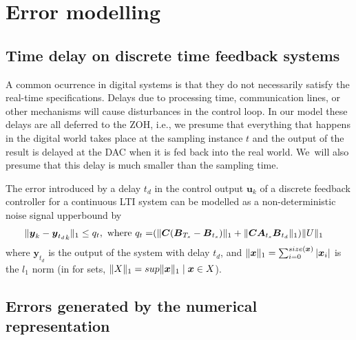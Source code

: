 \documentclass[sigconf]{llncs}
\DeclarePairedDelimiter\norm{\lVert}{\rVert}
\newcommand{\mat}[1]{\boldsymbol{#1}}
\renewcommand{\vec}[1]{\boldsymbol{#1}}
\begin{document}
\section{Error modelling}\label{sec:errors}

\subsection{Time delay on discrete time feedback systems} \label{sec:delay}
A common ocurrence in digital systems is that they do not necessarily
satisfy the real-time specifications.  Delays due to processing time,
communication lines, or other mechanisms will cause disturbances in the
control loop.  In our model these delays are all deferred to the ZOH, i.e.,
we presume that everything that happens in the digital world takes place at
the sampling instance $t$ and the output of the result is delayed at the DAC
when it is fed back into the real world.  We~will also presume that this
delay is much smaller than the sampling time.

\begin{theorem}
The error introduced by a delay $t_d$ in the control output $\vec{u}_k$ of a discrete feedback controller for a continuous LTI system can be modelled as a non-deterministic noise signal upperbound by 
\begin{align}
\norm{\vec{y}_{k}-{\vec{y}_{t_d}}_{k}}_1 \leq q_t, \text{ where } q_t=&(\norm{\mat{C}(\mat{B}_{T_s}-\mat{B}_{t_s})}_1+\norm{\mat{C}\mat{A}_{t_s}\mat{B}_{t_d}}_1)\norm{U}_1
\end{align}
where $\vec{y}_{t_d}$ is the output of the system with delay $t_d$, and $\norm{\vec{x}}_1=\sum_{i=0}^{size(\vec{x})} |\vec{x}_i|$ is the $l_1$ norm (in for sets, $\norm{X}_1 = sup \norm{\vec{x}}_1 \mid \vec{x} \in X$). 
\end{theorem}
%
\subsection{Errors generated by the numerical representation} 
\label{sec:numeric_rep}
\end{document}
